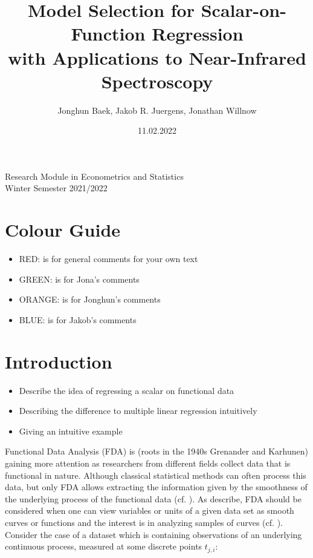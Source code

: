 \documentclass[11pt,twoside,a4paper]{article}
\begin{document}
	\title{{\LARGE Model Selection for Scalar-on-Function Regression \\ with Applications to Near-Infrared Spectroscopy}}
	\author{Jonghun Baek, Jakob R. Juergens, Jonathan Willnow}
	\date{11.02.2022}
	\maketitle
	\vspace{1.5 cm}
	\begin{center}
		Research Module in Econometrics and Statistics \\
		Winter Semester 2021/2022
	\end{center}
	
	\newpage
	
	\tableofcontents
	
	\newpage
	
	\section{Colour Guide}
		\begin{itemize}
			\item {\color{red} RED}: is for general comments for your own text
			\item {\color{green} GREEN}: is for Jona's comments
			\item {\color{orange} ORANGE}: is for Jonghun's comments
			\item {\color{blue} BLUE}: is for Jakob's comments
		\end{itemize}
	
	\section{Introduction}
	
	\begin{itemize}
		\item Describe the idea of regressing a scalar on functional data
		\item Describing the difference to multiple linear regression intuitively
		\item Giving an intuitive example
	\end{itemize}	
	Functional Data Analysis (FDA) is {\color{red} (roots in the 1940s Grenander and Karhunen)} gaining more attention as researchers from different fields collect data that is functional in nature. Although classical statistical methods can often process this data, but only FDA allows extracting the information given by the smoothness of the underlying process of the functional data (cf. \cite{levitin_introduction_2007}).
	 As \cite{kokoszka_introduction_2017} describe, FDA should be considered when one can view variables or units of a given data set as smooth curves or functions and the interest is in analyzing samples of curves (cf. \cite[S.~17]{kokoszka_introduction_2017}).\\
	 Consider the case of a dataset which is containing observations of an underlying continuous process, measured at some discrete points $t_{j,i}$: 
	 
\end{document}

